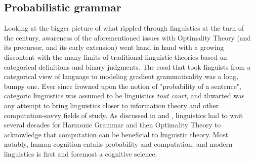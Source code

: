 \subsection{Probabilistic grammar}  %
Looking at the bigger picture of what rippled through linguistics at the turn of the century, awareness of the aforementioned issues with Optimality Theory (and its precursor, and its early extension) went hand in hand with a growing discontent with the many limits of traditional linguistic theories based on categorical definitions and binary judgments. The road that took linguists from a categorical view of language to modeling gradient grammaticality was a long, bumpy one. Ever since \textcite{chomsky1957syntactic} frowned upon the notion of "probability of a sentence", categoric linguistics was assumed to be linguistics \textit{tout court}, and thwarted was any attempt to bring linguistics closer to information theory and other computation-savvy fields of study. As discussed in  and , linguistics had to wait several decades for Harmonic Grammar and then Optimality Theory to acknowledge that computation can be beneficial to linguistic theory. Most notably, human cognition entails probability and computation, and modern linguistics is first and foremost a cognitive science.\\
